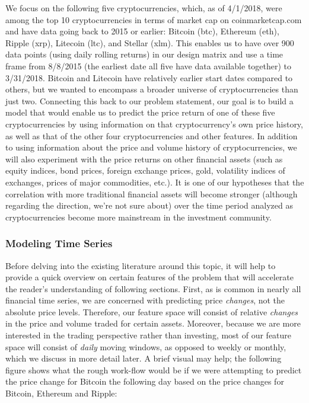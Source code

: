 \documentclass[12pt,twoside]{article}
\begin{document}
We focus on the following five cryptocurrencies, which, as of 4/1/2018, were among the top 10 cryptocurrencies in terms of market cap on coinmarketcap.com and have data going back to 2015 or earlier: Bitcoin (btc), Ethereum (eth), Ripple (xrp), Litecoin (ltc), and Stellar (xlm). This enables us to have over 900 data points (using daily rolling returns) in our design matrix and use a time frame from 8/8/2015 (the earliest date all five have data available together) to 3/31/2018. Bitcoin and Litecoin have relatively earlier start dates compared to others, but we wanted to encompass a broader universe of cryptocurrencies than just two. Connecting this back to our problem statement, our goal is to build a model that would enable us to predict the price return of one of these five cryptocurrencies by using information on that cryptocurrency's own price history, as well as that of the other four cryptocurrencies and other features.
\bigbreak
In addition to using information about the price and volume history of cryptocurrencies, we will also experiment with the price returns on other financial assets (such as equity indices, bond prices, foreign exchange prices, gold, volatility indices of exchanges, prices of major commodities, etc.). It is one of our hypotheses that the correlation with more traditional financial assets will become stronger (although regarding the direction, we’re not sure about) over the time period analyzed as cryptocurrencies become more mainstream in the investment community.
\subsubsection{Modeling Time Series}
Before delving into the existing literature around this topic, it will help to provide a quick overview on certain features of the problem that will accelerate the reader's understanding of following sections. First, as is common in nearly all financial time series, we are concerned with predicting price \textit{changes}, not the absolute price levels. Therefore, our feature space will consist of relative \textit{changes} in the price and volume traded for certain assets. Moreover, because we are more interested in the trading perspective rather than investing, most of our feature space will consist of \textit{daily} moving windows, as opposed to weekly or monthly, which we discuss in more detail later. A brief visual may help; the following figure shows what the rough work-flow would be if we were attempting to predict the price change for Bitcoin the following day based on the price changes for Bitcoin, Ethereum and Ripple:
\end{document}
